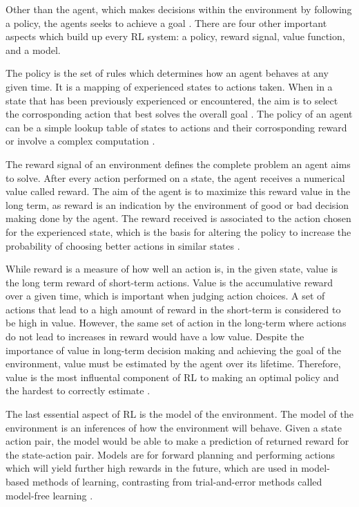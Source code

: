 Other than the agent, which makes decisions within the environment by following a policy, the agents seeks to achieve a goal \cite{Sutton1}. There are four other important aspects which build up every RL system: a policy, reward signal, value function, and a model.

The policy is the set of rules which determines how an agent behaves at any given time. It is a mapping of experienced states to actions taken. When in a state that has been previously experienced or encountered, the aim is to select the corrosponding action that best solves the overall goal \cite{GabrieleDe}. The policy of an agent can be a simple lookup table of states to actions and their corrosponding reward or involve a complex computation \cite{Sutton1}. 

The reward signal of an environment defines the complete problem an agent aims to solve. After every action performed on a state, the agent receives a numerical value called reward. The aim of the agent is to maximize this reward value in the long term, as reward is an indication by the environment of good or bad decision making done by the agent. The reward received is associated to the action chosen for the experienced state, which is the basis for altering the policy to increase the probability of choosing better actions in similar states \cite{Sutton1}. 

While reward is a measure of how well an action is, in the given state, value is the long term reward of short-term actions. Value is the accumulative reward over a given time, which is important when judging action choices. A set of actions that lead to a high amount of reward in the short-term is considered to be high in value. However, the same set of action in the long-term where actions do not lead to increases in reward would have a low value. Despite the importance of value in long-term decision making and achieving the goal of the environment, value must be estimated by the agent over its lifetime. Therefore, value is the most influental component of RL to making an optimal policy and the hardest to correctly estimate \cite{Sutton1}. 

The last essential aspect of RL is the model of the environment. The model of the environment is an inferences of how the environment will behave. Given a state action pair, the model would be able to make a prediction of returned reward for the state-action pair. Models are for forward planning and performing actions which will yield further high rewards in the future, which are used in model-based methods of learning, contrasting from trial-and-error methods called model-free learning \cite{Sutton1}.

